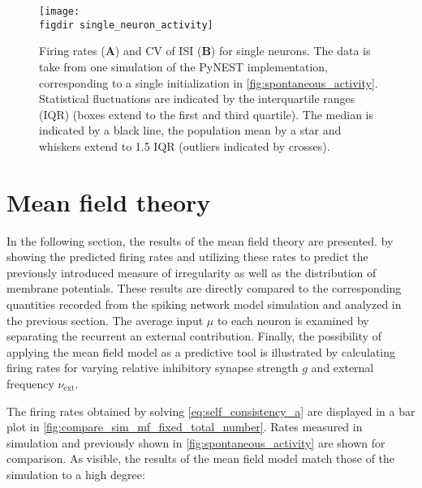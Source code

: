 \begin{figure}[tb]
    \centering
    \texttt{[image: \\figdir single\_neuron\_activity]}
    \caption[Firing rates and CV of ISI of single neurons]{
        Firing rates (\textbf{A}) and CV of ISI (\textbf{B}) for single neurons. 
        The data is take from one simulation of the PyNEST implementation, 
        corresponding to a single initialization in \autoref{fig:spontaneous_activity}.
        Statistical fluctuations 
        are indicated by the interquartile ranges (IQR) (boxes extend to 
        the first and third quartile). 
        The median is indicated by a black line, the population mean by a star and 
        whiskers extend to 1.5 IQR (outliers indicated by crosses). 
    }
    \label{fig:single_neuron_activity}
\end{figure}

\section{Mean field theory}
In the following section, the results of the mean field theory are presented.
by showing the predicted firing rates and utilizing these rates 
to predict the previously introduced measure of irregularity
as well as the distribution of membrane potentials. 
These results are directly compared to 
the corresponding quantities recorded from the spiking network 
model simulation and analyzed in the previous section. 
The average input $\mu$ to each neuron is examined by separating 
the recurrent an external contribution. Finally, the possibility of  
applying the mean field model as a predictive tool is illustrated 
by calculating firing rates for varying relative inhibitory synapse 
strength $g$ and external frequency $\nu_\text{ext}$. 

The firing rates obtained by solving 
\autoref{eq:self_consistency_a} are displayed in a bar plot in 
\autoref{fig:compare_sim_mf_fixed_total_number}. Rates measured in 
simulation and previously shown in \autoref{fig:spontaneous_activity}
are shown for comparison. As visible, the results of the mean field model 
match those of the simulation to a high degree:

